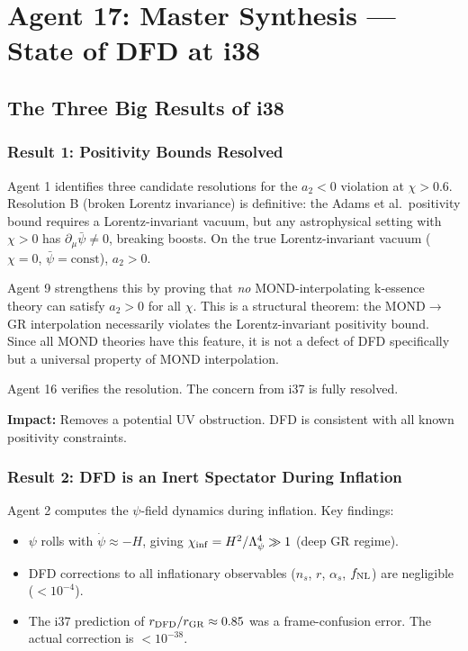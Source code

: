 \documentclass[11pt,a4paper]{article}
\begin{document}
\newpage
\section{Agent 17: Master Synthesis --- State of DFD at i38}
\label{sec:agent17}

\subsection{The Three Big Results of i38}

\subsubsection{Result 1: Positivity Bounds Resolved}

Agent 1 identifies three candidate resolutions for the $a_2 < 0$ violation at $\chi > 0.6$. Resolution B (broken Lorentz invariance) is definitive: the Adams et al.\ positivity bound requires a Lorentz-invariant vacuum, but any astrophysical setting with $\chi > 0$ has $\partial_\mu\bar{\psi} \neq 0$, breaking boosts. On the true Lorentz-invariant vacuum ($\chi = 0$, $\bar{\psi} = \text{const}$), $a_2 > 0$.

Agent 9 strengthens this by proving that \emph{no} MOND-interpolating k-essence theory can satisfy $a_2 > 0$ for all $\chi$. This is a structural theorem: the MOND$\to$GR interpolation necessarily violates the Lorentz-invariant positivity bound. Since all MOND theories have this feature, it is not a defect of DFD specifically but a universal property of MOND interpolation.

Agent 16 verifies the resolution. The concern from i37 is fully resolved.

\textbf{Impact:} Removes a potential UV obstruction. DFD is consistent with all known positivity constraints.

\subsubsection{Result 2: DFD is an Inert Spectator During Inflation}

Agent 2 computes the $\psi$-field dynamics during inflation. Key findings:
\begin{itemize}
\item $\psi$ rolls with $\dot{\psi} \approx -H$, giving $\chi_{\rm inf} = H^2/\Lambda_\psi^4 \gg 1$ (deep GR regime).
\item DFD corrections to all inflationary observables ($n_s$, $r$, $\alpha_s$, $f_{\rm NL}$) are negligible ($< 10^{-4}$).
\item The i37 prediction of $r_{\rm DFD}/r_{\rm GR} \approx 0.85$ was a frame-confusion error. The actual correction is $< 10^{-38}$.
\end{itemize}
\end{document}
